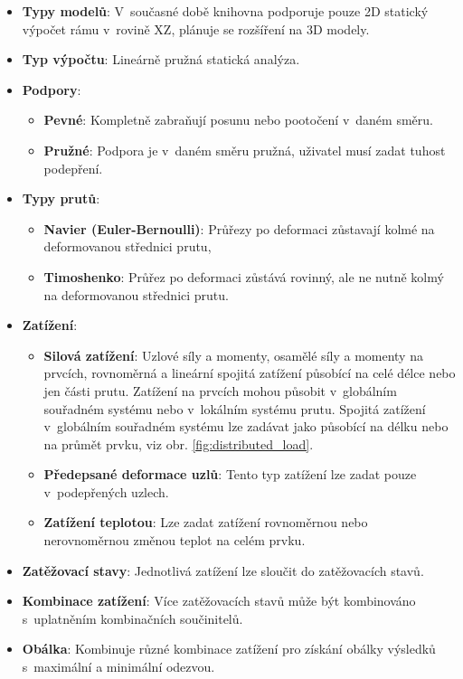\begin{itemize}
    \item \textbf{Typy modelů}: V~současné době knihovna podporuje pouze 2D statický výpočet rámu v~rovině \gls{X}\gls{Z}, plánuje se rozšíření na 3D modely.
    \item \textbf{Typ výpočtu}: Lineárně pružná statická analýza.
    \item \textbf{Podpory}: 
        \begin{itemize}
            \item \textbf{Pevné}: Kompletně zabraňují posunu nebo pootočení v~daném směru.
            \item \textbf{Pružné}: Podpora je v~daném směru pružná, uživatel musí zadat tuhost podepření.
        \end{itemize}
    \item \textbf{Typy prutů}:
        \begin{itemize}
            \item \textbf{Navier (Euler-Bernoulli)}: Průřezy po deformaci zůstavají kolmé na deformovanou střednici prutu,
            \item \textbf{Timoshenko}: Průřez po deformaci zůstává rovinný, ale ne nutně kolmý na deformovanou střednici prutu.
        \end{itemize}
    \item \textbf{Zatížení}:
        \begin{itemize}
            \item \textbf{Silová zatížení}: Uzlové síly a momenty, osamělé síly a momenty na prvcích, rovnoměrná a lineární spojitá zatížení působící na celé délce nebo jen části prutu. Zatížení na prvcích mohou působit v~globálním souřadném systému nebo v~lokálním systému prutu. Spojitá zatížení v~globálním souřadném systému lze zadávat jako působící na délku nebo na průmět prvku, viz obr. \ref{fig:distributed_load}.
            \item \textbf{Předepsané deformace uzlů}: Tento typ zatížení lze zadat pouze v~podepřených uzlech.
            \item \textbf{Zatížení teplotou}: Lze zadat zatížení rovnoměrnou nebo nerovnoměrnou změnou teplot na celém prvku.
        \end{itemize}
    \item \textbf{Zatěžovací stavy}: Jednotlivá zatížení lze sloučit do zatěžovacích stavů.
    \item \textbf{Kombinace zatížení}: Více zatěžovacích stavů může být kombinováno s~uplatněním kombinačních součinitelů.
    \item \textbf{Obálka}: Kombinuje různé kombinace zatížení pro získání obálky výsledků s~maximální a minimální odezvou.
\end{itemize}

